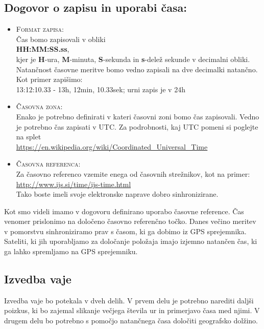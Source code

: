 \subsection{Dogovor o zapisu in uporabi časa:}
\begin{itemize}
	\item \textsc{Format zapisa}:\\[2mm]
	Čas bomo zapisovali v obliki\\[2mm] 
	\textbf{HH:MM:SS.ss},\\[2mm]
	kjer je \textbf{H}-ura, \textbf{M}-minuta, \textbf{S}-sekunda in \textbf{s}-delež sekunde v decimalni obliki. Natančnost časovne meritve bomo vedno zapisali na dve decimalki natančno. Kot primer zapišimo:\\[2mm] 
	13:12:10.33 - 13h, 12min, 10.33sek; urni zapis je v 24h\\
	\item \textsc{Časovna zona}:\\[2mm]
	Enako je potrebno definirati v kateri časovni zoni bomo čas zapisovali. Vedno je potrebno čas zapisati v UTC. Za podrobnosti, kaj UTC pomeni si poglejte na splet\\[2mm] \url{https://en.wikipedia.org/wiki/Coordinated_Universal_Time}\\
	
	\item \textsc{Časovna referenca}:\\[2mm]
	Za časovno referenco vzemite enega od časovnih strežnikov, kot na primer:\\[2mm]
	\url{http://www.ijs.si/time/ijs-time.html}\\[2mm]
	Tako boste imeli svoje elektronske naprave dobro sinhronizirane.\\
\end{itemize}

Kot smo videli imamo v dogovoru definirano uporabo časovne reference. Čas venomer prislonimo na določeno časovno referenčno točko. Danes večino meritev v pomorstvu sinhroniziramo prav s časom, ki ga dobimo iz GPS sprejemnika. Sateliti, ki jih uporabljamo za določanje položaja imajo izjemno natančen čas, ki ga lahko spremljamo na GPS sprejemniku.



\subsection{Izvedba vaje}
Izvedba vaje bo potekala v dveh delih. V prvem delu je potrebno narediti daljši poizkus, ki bo zajemal slikanje večjega števila ur in primerjavo časa med njimi. V drugem delu bo potrebno s pomočjo natančnega časa določiti geografsko dolžino.


